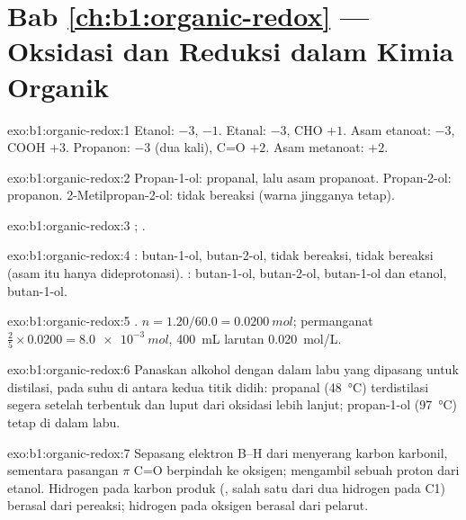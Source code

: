 \section*{Bab \ref{ch:b1:organic-redox} --- Oksidasi dan Reduksi dalam Kimia Organik}

\begin{solution}{exo:b1:organic-redox:1}
Etanol:  $-3$,  $-1$. Etanal:  $-3$, CHO $+1$.
Asam etanoat:  $-3$, COOH $+3$. Propanon:  $-3$ (dua
kali), C=O $+2$. Asam metanoat: $+2$.
\end{solution}

\begin{solution}{exo:b1:organic-redox:2}
Propan-1-ol: propanal, lalu asam propanoat. Propan-2-ol: propanon.
2-Metilpropan-2-ol: tidak bereaksi (warna jingganya tetap).
\end{solution}

\begin{solution}{exo:b1:organic-redox:3}
;
.
\end{solution}

\begin{solution}{exo:b1:organic-redox:4}
: butan-1-ol, butan-2-ol, tidak bereaksi, tidak bereaksi (asam
itu hanya dideprotonasi). : butan-1-ol, butan-2-ol, butan-1-ol
dan etanol, butan-1-ol.
\end{solution}

\begin{solution}{exo:b1:organic-redox:5}
.
$n = 1.20/60.0 = \qty{0.0200}{mol}$; permanganat $\frac25 \times 0.0200 =
\qty{8.0e-3}{mol}$, \qty{400}{mL} larutan \qty{0.020}{mol/L}.
\end{solution}

\begin{solution}{exo:b1:organic-redox:6}
Panaskan alkohol dengan  dalam labu yang dipasang untuk
distilasi, pada suhu di antara kedua titik didih: propanal
(\qty{48}{\celsius}) terdistilasi segera setelah terbentuk dan luput dari
oksidasi lebih lanjut; propan-1-ol (\qty{97}{\celsius}) tetap di dalam
labu.
\end{solution}

\begin{solution}{exo:b1:organic-redox:7}
Sepasang elektron B--H dari  menyerang karbon karbonil, sementara
pasangan $\pi$ C=O berpindah ke oksigen;  mengambil sebuah
proton dari etanol. Hidrogen pada karbon produk (, salah satu
dari dua hidrogen pada C1) berasal dari pereaksi; hidrogen pada oksigen
berasal dari pelarut.
\end{solution}

